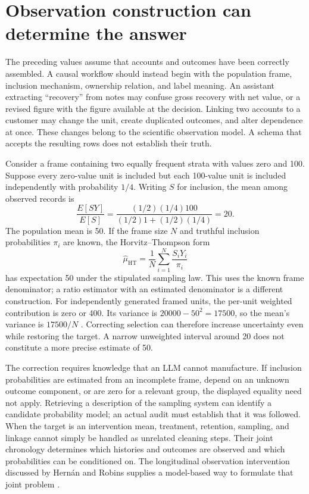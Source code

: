 \section{Observation construction can determine the answer}
\label{exec14:l5-observations}

The preceding values assume that accounts and outcomes have been correctly
assembled. A causal workflow should instead begin with the population frame,
inclusion mechanism, ownership relation, and label meaning. An assistant
extracting ``recovery'' from notes may confuse gross recovery with net value,
or a revised figure with the figure available at the decision. Linking two
accounts to a customer may change the unit, create duplicated outcomes, and
alter dependence at once. These changes belong to the scientific observation
model. A schema that accepts the resulting rows does not establish their truth.

Consider a frame containing two equally frequent strata with values zero and
100. Suppose every zero-value unit is included but each 100-value unit is
included independently with probability $1/4$. Writing $S$ for inclusion,
the mean among observed records is
\[
 \frac{E[SY]}{E[S]}=
 \frac{(1/2)(1/4)100}{(1/2)1+(1/2)(1/4)}=20.
\]
The population mean is 50. If the frame size $N$ and truthful inclusion
probabilities $\pi_i$ are known, the Horvitz--Thompson form
\[
 \widehat\mu_{\mathrm{HT}}=
 \frac1N\sum_{i=1}^N\frac{S_iY_i}{\pi_i}
\]
has expectation 50 under the stipulated sampling law. This uses the known
frame denominator; a ratio estimator with an estimated denominator is a
different construction. For independently generated framed units, the
per-unit weighted contribution is zero or 400. Its variance is
$20000-50^2=17500$, so the mean's variance is $17500/N$
\cite{exec14_workflow_oracle}. Correcting selection can therefore increase
uncertainty even while restoring the target. A narrow unweighted interval
around 20 does not constitute a more precise estimate of 50.

The correction requires knowledge that an LLM cannot manufacture. If inclusion
probabilities are estimated from an incomplete frame, depend on an unknown
outcome component, or are zero for a relevant group, the displayed equality
need not apply. Retrieving a description of the sampling system can identify
a candidate probability model; an actual audit must establish that it was
followed. When the target is an intervention mean, treatment, retention,
sampling, and linkage cannot simply be handled as unrelated cleaning steps.
Their joint chronology determines which histories and outcomes are observed
and which probabilities can be conditioned on. The longitudinal observation
intervention discussed by Hern\'an and Robins supplies a model-based way to
formulate that joint problem \cite{hernan2020}.

